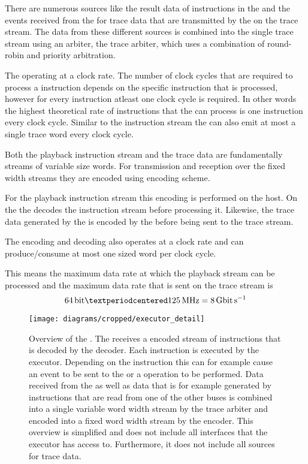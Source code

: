 There are numerous sources like the result data of instructions in the \readCat{} and the events received from the \ASIC{} for trace data that are transmitted by the \pbexec{} on the trace stream. The data from these different sources is combined into the single trace stream using an arbiter, the trace arbiter, which uses a combination of round-robin and priority arbitration.

The \pbexec{} operating at a \pbExecClock{} clock rate. The number of clock cycles that are required to process a instruction depends on the specific instruction that is processed, however for every instruction atleast one clock cycle is required. In other words the highest theoretical rate of instructions that the \pbexec{} can process is one instruction every clock cycle. Similar to the instruction stream the \pbexec{} can also emit at most a single trace word every clock cycle.

Both the playback instruction stream and the trace data are fundamentally streams of variable size words. For transmission and reception over the fixed width \HostARQ{} streams they are encoded using \UT{} encoding scheme\autocite{karasenko2020neumann}.

For the playback instruction stream this encoding is performed on the host. On the \FPGA{} the \pbexec{} decodes the instruction stream before processing it.
Likewise, the trace data generated by the \pbexec{} is encoded by the \pbexec{} before being sent to the trace stream.

The encoding and decoding also operates at a \pbExecClock{} clock rate and can produce/consume at most one \PhyWordSize{} sized word per clock cycle.

This means the maximum data rate at which the playback stream can be processed and the maximum data rate that is sent on the trace stream is
\[\PhyWordSize{} · \pbExecClock{} = \pbExecBandwidth{}\]

\begin{figure}
\centerline{\texttt{[image: diagrams/cropped/executor\_detail]}}
\caption{Overview of the \pbexec{}. The \pbexec{} receives a \UT{} encoded stream of instructions that is decoded by the \UT{} decoder. Each instruction is executed by the executor. Depending on the instruction this can for example cause an event to be sent to the \ASIC{} or a \JTAG{} operation to be performed. Data received from the \ASIC{} as well as data that is for example generated by instructions that are read from one of the other \FPGA{} buses is combined into a single variable word width stream by the trace arbiter and encoded into a fixed word width stream by the \UT{} encoder.
This overview is simplified and does not include all interfaces that the executor has access to. Furthermore, it does not include all sources for trace data.}\label{diagram:executor}
\end{figure}


